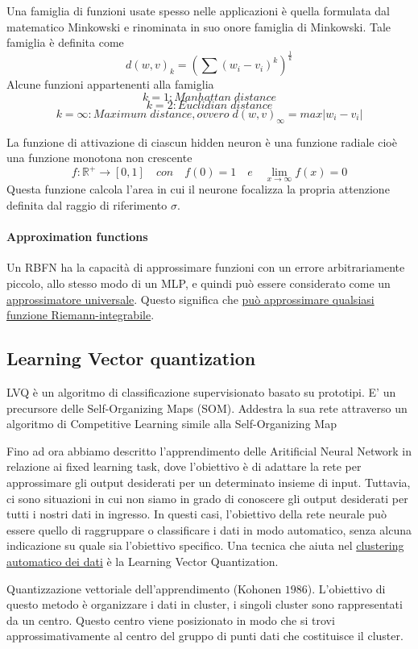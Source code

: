 Una famiglia di funzioni usate spesso nelle applicazioni è quella formulata dal matematico Minkowski e rinominata in suo onore famiglia di Minkowski. Tale famiglia è definita come
$$d(w,v)_k = (\sum (w_i - v_i)^k)^{\frac{1}{k}}$$
Alcune funzioni appartenenti alla famiglia
$$k = 1: \mathit{Manhattan\;distance}$$
$$k=2:\mathit{Euclidian\;distance}$$
$$k = \infty: \mathit{Maximum\;distance, ovvero\;} d(w,v)_\infty = max |w_i - v_i|$$

La funzione di attivazione di ciascun hidden neuron è una funzione radiale cioè una funzione monotona non crescente
$$f: \mathbb{R}^{+} \to [0,1] \quad \mathit{con} \quad f(0) = 1 \quad \mathit{e} \quad \lim_{x \to \infty} f(x) = 0$$
Questa funzione calcola l’area in cui il neurone focalizza la propria attenzione definita dal raggio di riferimento $\sigma$.


\paragraph{Approximation functions}
Un RBFN ha la capacità di approssimare funzioni con un errore arbitrariamente piccolo, allo stesso modo di un MLP, e quindi può essere considerato come un \uline{approssimatore universale}. Questo significa che \uline{può approssimare qualsiasi funzione Riemann-integrabile}.

\subsection{Learning Vector quantization}
LVQ è un algoritmo di classificazione supervisionato basato su prototipi. E' un precursore delle Self-Organizing Maps (SOM). Addestra la sua rete attraverso un algoritmo di Competitive Learning simile alla Self-Organizing Map

Fino ad ora abbiamo descritto l'apprendimento delle Aritificial Neural Network in relazione ai fixed learning task, dove l'obiettivo è di adattare la rete per approssimare gli output desiderati per un determinato insieme di input. Tuttavia, ci sono situazioni in cui non siamo in grado di conoscere gli output desiderati per tutti i nostri dati in ingresso. In questi casi, l'obiettivo della rete neurale può essere quello di raggruppare o classificare i dati in modo automatico, senza alcuna indicazione su quale sia l'obiettivo specifico. Una tecnica che aiuta nel \uline{clustering automatico dei dati} è la Learning Vector Quantization.

Quantizzazione vettoriale dell'apprendimento (Kohonen $1986$). L'obiettivo di questo metodo è organizzare i dati in cluster, i singoli cluster sono rappresentati da un centro. Questo centro viene posizionato in modo che si trovi approssimativamente al centro del gruppo di punti dati che costituisce il cluster.

